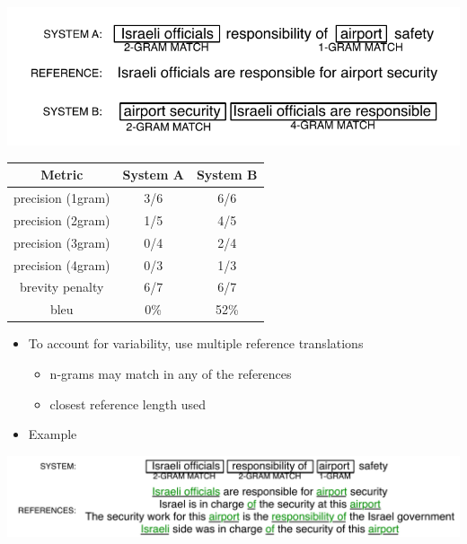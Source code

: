 \documentclass[landscape]{slides}
\begin{document}
\begin{center}
\includegraphics[scale=1.5]{bleu-example.pdf}

\begin{tabular}{c|c|c}
{\bf Metric} & \bf System A & \bf System B \\ \hline
precision (1gram) & 3/6 & 6/6 \\ \hline
precision (2gram) & 1/5 & 4/5 \\ \hline
precision (3gram) & 0/4 & 2/4 \\ \hline
precision (4gram) & 0/3 & 1/3  \\ \hline
brevity penalty   & 6/7 & 6/7  \\ \hline 
{\sc bleu} &  0\% & 52\%  \\ \hline
\end{tabular}
\end{center}



\vspace{10mm}
\begin{itemize}
\item To account for variability, use multiple reference translations
\begin{itemize}
\item n-grams may match in any of the references
\item closest reference length used
\end{itemize}
\item Example\vspace{5mm}
\end{itemize}
\begin{center}
\includegraphics[scale=1.4]{multi-bleu-example-color.pdf}
\end{center}
\end{document}

